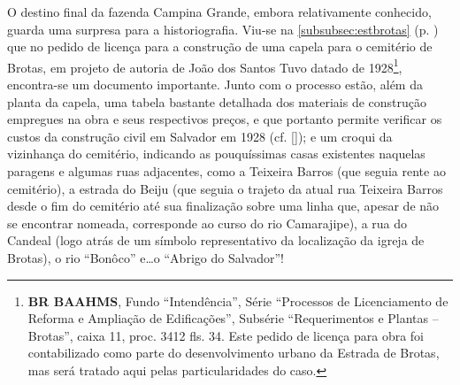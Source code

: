 





















O destino final da fazenda Campina Grande, embora relativamente conhecido, guarda uma surpresa para a historiografia. Viu-se na \autoref{subsubsec:estbrotas} (p. \pageref{subsubsec:estbrotas}) que no pedido de licença para a construção de uma capela para o cemitério de Brotas, em projeto de autoria de João dos Santos Tuvo datado de 1928\footnote{\textbf{BR BAAHMS}, Fundo ``Intendência'', Série ``Processos de Licenciamento de Reforma e Ampliação de Edificações'', Subsérie ``Requerimentos e Plantas -- Brotas'', caixa 11, proc. 3412 fls. 34. Este pedido de licença para obra foi contabilizado como parte do desenvolvimento urbano da Estrada de Brotas, mas será tratado aqui pelas particularidades do caso.}, encontra-se um documento importante. Junto com o processo estão, além da planta da capela, uma tabela bastante detalhada dos materiais de construção empregues na obra e seus respectivos preços, e que portanto permite verificar os custos da construção civil em Salvador em 1928 (cf. \autoref{}); e um croqui da vizinhança do cemitério, indicando as pouquíssimas casas existentes naquelas paragens e algumas ruas adjacentes, como a Teixeira Barros (que seguia rente ao cemitério), a estrada do Beiju (que seguia o trajeto da atual rua Teixeira Barros desde o fim do cemitério até sua finalização sobre uma linha que, apesar de não se encontrar nomeada, corresponde ao curso do rio Camarajipe), a rua do Candeal (logo atrás de um símbolo representativo da localização da igreja de Brotas), o rio ``Bonôco'' e\dots o ``Abrigo do Salvador''!

